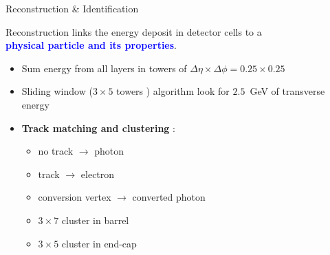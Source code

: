 \begin{frame}{Reconstruction \& Identification}
  \begin{center}
    Reconstruction links the energy deposit in detector cells to a \\ \textcolor{blue}{\bf physical particle and its properties}.
    \begin{itemize}
      \item Sum energy from all layers in towers of $\Delta\eta\times\Delta\phi =0.25\times 0.25$
      \item Sliding window ($3 \times 5$ towers ) algorithm look for $2.5$~GeV of transverse energy
        \vfill
    \item {\bf Track matching and clustering} :\\
      \begin{minipage}{0.49\linewidth}
      \begin{itemize}
      \item no track $\rightarrow$ photon 
      \item track $\rightarrow$ electron
      \item conversion vertex $\rightarrow$ converted photon
      \end{itemize}
      \end{minipage}
      \hfill
      \begin{minipage}{0.49\linewidth}
        \begin{itemize}
        \item $3\times 7$ cluster  in barrel
        \item $3\times 5$ cluster  in end-cap
        \end{itemize}
      \end{minipage}
    \end{itemize}
  \end{center}
\end{frame}


